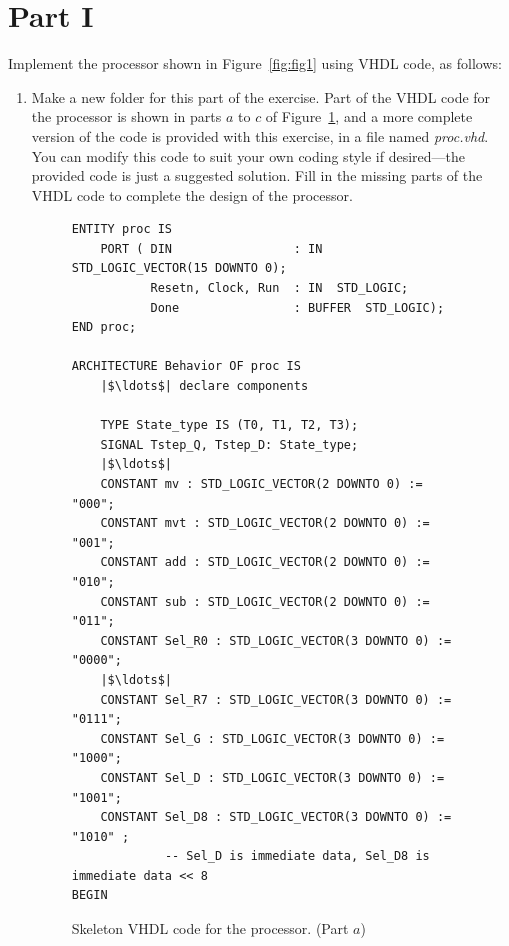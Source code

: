 \documentclass[epsfig,10pt,fullpage]{article}
\begin{document}
\section*{Part I}
Implement the processor shown in Figure~\ref{fig:fig1} using VHDL code, as follows:
\begin{enumerate}
\item Make a new folder for this part of the exercise. 
Part of the VHDL code for the processor is shown in parts $a$ to $c$ of 
Figure~\ref{fig:fig2}, and a more complete version of the code is provided with this exercise,
in a file named {\it proc.vhd}. You can modify this code to suit your own coding style
if desired---the provided code is just a suggested solution. Fill in the missing parts of
the VHDL code to complete the design of the processor.

\lstset{language=VHDL,numbers=none,escapechar=|}
\begin{figure}[h]
\begin{center}
\begin{minipage}[t]{15 cm}
\begin{lstlisting}[name=proc]
ENTITY proc IS
    PORT ( DIN                 : IN  STD_LOGIC_VECTOR(15 DOWNTO 0);
           Resetn, Clock, Run  : IN  STD_LOGIC;
           Done                : BUFFER  STD_LOGIC);
END proc;
   
ARCHITECTURE Behavior OF proc IS
    |$\ldots$| declare components
   
    TYPE State_type IS (T0, T1, T2, T3);
    SIGNAL Tstep_Q, Tstep_D: State_type;
    |$\ldots$|
    CONSTANT mv : STD_LOGIC_VECTOR(2 DOWNTO 0) := "000";
    CONSTANT mvt : STD_LOGIC_VECTOR(2 DOWNTO 0) := "001";
    CONSTANT add : STD_LOGIC_VECTOR(2 DOWNTO 0) := "010";
    CONSTANT sub : STD_LOGIC_VECTOR(2 DOWNTO 0) := "011";
    CONSTANT Sel_R0 : STD_LOGIC_VECTOR(3 DOWNTO 0) := "0000";
    |$\ldots$|
    CONSTANT Sel_R7 : STD_LOGIC_VECTOR(3 DOWNTO 0) := "0111";
    CONSTANT Sel_G : STD_LOGIC_VECTOR(3 DOWNTO 0) := "1000";
    CONSTANT Sel_D : STD_LOGIC_VECTOR(3 DOWNTO 0) := "1001";
    CONSTANT Sel_D8 : STD_LOGIC_VECTOR(3 DOWNTO 0) := "1010" ;
             -- Sel_D is immediate data, Sel_D8 is immediate data << 8
BEGIN
\end{lstlisting}
\end{minipage}
\caption{Skeleton VHDL code for the processor. (Part $a$)}
\label{fig:fig2}
\end{center}
\end{figure}


\end{enumerate}
\end{document}

